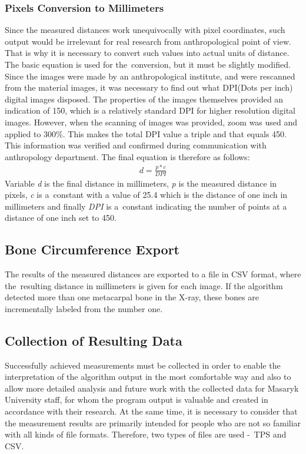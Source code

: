 \subsubsection*{Pixels Conversion to Millimeters}
Since the measured distances work unequivocally with pixel coordinates, such output would be irrelevant for real research from anthropological point of view. That is why it is necessary to convert such values into actual units of distance. The basic equation is used for the~conversion, but it must be slightly modified. Since the images were made by an anthropological institute, and were rescanned from the material images, it was necessary to find out what DPI(Dots per inch) digital images disposed. The properties of the images themselves provided an indication of 150, which is a relatively standard DPI for higher resolution digital images. However, when the scanning of images was provided, zoom was used and applied to 300\%. This makes the total DPI value a triple and that equals 450. This information was verified and confirmed during communication with anthropology department. The final equation is therefore as follows:
\begin{equation}
\begin{split}
d = \frac{p * c}{DPI} 
\end{split}
\end{equation}
Variable \textit{d} is the final distance in millimeters, \textit{p} is the measured distance in pixels, \textit{c} is a~constant with a value of 25.4 which is the distance of one inch in millimeters and finally \textit{DPI} is a~constant indicating the number of points at a distance of one inch set to 450.

\subsection{Bone Circumference Export}
The results of the measured distances are exported to a file in CSV format, where the~resulting distance in millimeters is given for each image. If the algorithm detected more than one metacarpal bone in the X-ray, these bones are incrementally labeled from the number one.

\subsection{Collection of Resulting Data}
Successfully achieved measurements must be collected in order to enable the interpretation of the algorithm output in the most comfortable way and also to allow more detailed analysis and future work with the collected data for Masaryk University staff, for whom the program output is valuable and created in accordance with their research. At the same time, it is necessary to consider that the measurement results are primarily intended for people who are not so familiar with all kinds of file formats. Therefore, two types of files are used -~TPS and CSV.

